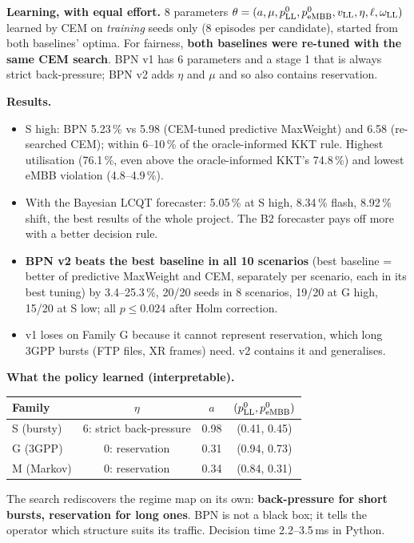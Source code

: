 \documentclass[11pt,a4paper]{article}
\begin{document}
\textbf{Learning, with equal effort.} 8 parameters $\theta = (a,\mu,p^0_{\rm LL},p^0_{\rm eMBB},v_{\rm LL},\eta,\ell,\omega_{\rm LL})$ learned by CEM on \emph{training} seeds only (8 episodes per candidate), started from both baselines' optima. For fairness, \textbf{both baselines were re-tuned with the same CEM search}. BPN v1 has 6 parameters and a stage 1 that is always strict back-pressure; BPN v2 adds $\eta$ and $\mu$ and so also contains reservation.

\textbf{Results.}
\begin{itemize}
  \item S high: BPN 5.23\,\% vs 5.98 (CEM-tuned predictive MaxWeight) and 6.58 (re-searched CEM); within 6--10\,\% of the oracle-informed KKT rule. Highest utilisation (76.1\,\%, even above the oracle-informed KKT's 74.8\,\%) and lowest eMBB violation (4.8--4.9\,\%).
  \item With the Bayesian LCQT forecaster: 5.05\,\% at S high, 8.34\,\% flash, 8.92\,\% shift, the best results of the whole project. The B2 forecaster pays off more with a better decision rule.
  \item \textbf{BPN v2 beats the best baseline in all 10 scenarios} (best baseline = better of predictive MaxWeight and CEM, separately per scenario, each in its best tuning) by 3.4--25.3\,\%, 20/20 seeds in 8 scenarios, 19/20 at G high, 15/20 at S low; all $p \le 0.024$ after Holm correction.
  \item v1 loses on Family G because it cannot represent reservation, which long 3GPP bursts (FTP files, XR frames) need. v2 contains it and generalises.
\end{itemize}

\textbf{What the policy learned (interpretable).}
\begin{center}
\begin{tabular}{lccc}
\toprule
Family & $\eta$ & $a$ & $(p^0_{\rm LL}, p^0_{\rm eMBB})$ \\
\midrule
S (bursty) & 6: strict back-pressure & 0.98 & (0.41, 0.45) \\
G (3GPP) & 0: reservation & 0.31 & (0.94, 0.73) \\
M (Markov) & 0: reservation & 0.34 & (0.84, 0.31) \\
\bottomrule
\end{tabular}
\end{center}
The search rediscovers the regime map on its own: \textbf{back-pressure for short bursts, reservation for long ones}. BPN is not a black box; it tells the operator which structure suits its traffic. Decision time 2.2--3.5\,ms in Python.
\end{document}
